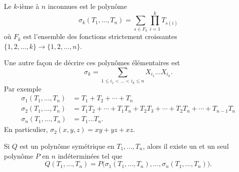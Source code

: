 \begin{definition}  \label{DEFooTREUooZKoXeg}
    Le \( k\)-ième  à \( n\) inconnues est le polynôme
    \begin{equation}
        \sigma_k(T_1,\ldots, T_n)=\sum_{s\in F_k}\prod_{i=1}^kT_{s(i)}
    \end{equation}
    où \( F_k\) est l'ensemble des fonctions strictement croissantes \( \{ 1,2,\ldots, k \}\to\{ 1,2,\ldots, n \}\).
\end{definition}

Une autre façon de décrire ces polynômes élémentaires est
\begin{equation}
    \sigma_k=\sum_{1\leq i_1<\ldots<i_k\leq n}X_{i_1}\ldots X_{i_k}.
\end{equation}
Par exemple
\begin{subequations}
    \begin{align}
        \sigma_1(T_1,\ldots, T_n)&=T_1+T_2+\cdots +T_n\\
        \sigma_2(T_1,\ldots, T_n)&=T_1T_2+\cdots +T_1T_n+T_2T_3+\cdots +T_2T_n+\cdots +T_{n-1}T_n\\
        \sigma_n(T_1,\ldots, T_n)&=T_1\ldots T_n.
    \end{align}
\end{subequations}
En particulier, \( \sigma_2(x,y,z)=xy+yz+xz\).

\begin{theorem}  \label{TholReBiw}
    Si \( Q\) est un polynôme symétrique en \( T_1,\ldots, T_n\), alors il existe un et un seul polynôme \( P\) en \( n\) indéterminées tel que
    \begin{equation}
        Q(T_1,\ldots, T_n)=P\big( \sigma_1(T_1,\ldots, T_n),\ldots, \sigma_n(T_1,\ldots, T_n) \big).
    \end{equation}
\end{theorem}

